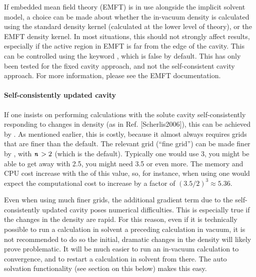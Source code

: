 \documentclass[letterpaper,10pt,english]{sphinxmanual}
\begin{document}
If embedded mean field theory (EMFT) is in use alongside the implicit
solvent model, a choice can be made about whether the in-vacuum density
is calculated using the standard density kernel (calculated at the lower
level of theory), or the EMFT density kernel. In most situations, this
should not strongly affect results, especially if the active region in
EMFT is far from the edge of the cavity. This can be controlled using
the keyword , which is false by default. This has only
been tested for the fixed cavity approach, and not the self-consistent
cavity approach. For more information, please see the EMFT
documentation.


\paragraph{Self-consistently updated cavity}
\label{\detokenize{implicit_solvation_v3:self-consistently-updated-cavity}}
If one insists on performing calculations with the solute cavity
self-consistently responding to changes in density (as in Ref. {[}Scherlis2006{]}), this
can be achieved by . As mentioned
earlier, this is costly, because it almost always requires grids that
are finer than the default. The relevant grid (“fine grid”) can be made
finer by , with \(\texttt{\textit{n}}>2\)
(which is the default). Typically one would use 3, you might be able to
get away with 2.5, you might need 3.5 or even more. The memory and CPU
cost increase with the  of this value, so, for instance, when
using  one would expect the computational cost to
increase by a factor of \({\left(3.5/2\right)}^3\approx5.36\).

Even when using much finer grids, the additional gradient term due to
the self-consistently updated cavity poses numerical difficulties. This
is especially true if the changes in the density are rapid. For this
reason, even if it is technically possible to run a calculation in
solvent  a preceding calculation in vacuum, it is not
recommended to do so \textendash{} the initial, dramatic changes in the density will
likely prove problematic. It will be much easier to run an in-vacuum
calculation to convergence, and to restart a calculation in solvent from
there. The auto solvation functionality (see section on this below)
makes this easy.
\end{document}
